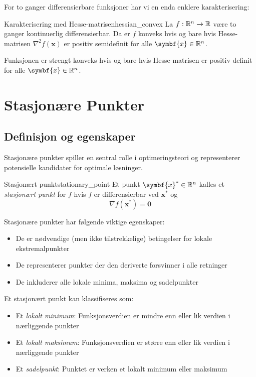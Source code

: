 For to ganger differensierbare funksjoner har vi en enda enklere karakterisering:

\begin{proposition}{Karakterisering med Hesse-matrisen}{hessian_convex}
	La \(f: \mathbb{R}^n \to \mathbb{R}\) være to ganger kontinuerlig differensierbar. Da er \(f\) konveks hvis og bare hvis Hesse-matrisen \(\nabla^2 f(\symbf{x})\) er positiv semidefinit for alle \(\symbf{x} \in \R^n\).

	Funksjonen er strengt konveks hvis og bare hvis Hesse-matrisen er positiv definit for alle \(\symbf{x} \in \R^n\).
\end{proposition}

\section{Stasjonære Punkter}
\label{sec:stationary_points}

\subsection{Definisjon og egenskaper}
\label{subsec:stationary_def_prop}

Stasjonære punkter spiller en sentral rolle i optimeringsteori og representerer potensielle kandidater for optimale løsninger.

\begin{definition}{Stasjonært punkt}{stationary_point}
	Et punkt \(\symbf{x}^\ast \in \R^n\) kalles et \textit{stasjonært punkt} for \(f\) hvis \(f\) er differensierbar ved \(\symbf{x}^\ast\) og
	\[
		\nabla f(\symbf{x}^\ast) = \symbf{0}
	\]
\end{definition}

Stasjonære punkter har følgende viktige egenskaper:
\begin{itemize}
	\item De er nødvendige (men ikke tilstrekkelige) betingelser for lokale ekstremalpunkter
	\item De representerer punkter der den deriverte forsvinner i alle retninger
	\item De inkluderer alle lokale minima, maksima og sadelpunkter
\end{itemize}

Et stasjonært punkt kan klassifiseres som:
\begin{itemize}
	\item Et \textit{lokalt minimum}: Funksjonsverdien er mindre enn eller lik verdien i nærliggende punkter
	\item Et \textit{lokalt maksimum}: Funksjonsverdien er større enn eller lik verdien i nærliggende punkter
	\item Et \textit{sadelpunkt}: Punktet er verken et lokalt minimum eller maksimum
\end{itemize}

